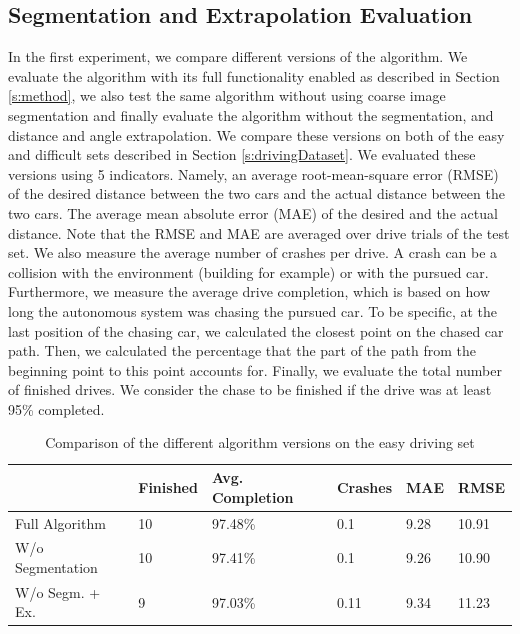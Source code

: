 \documentclass{ctuthesis/ctuthesis}
\begin{document}
\subsection{Segmentation and Extrapolation Evaluation} \label{s:experiment1}
In the first experiment, we compare different versions of the algorithm. We evaluate the algorithm with its full functionality enabled as described in Section \ref{s:method}, we also test the same algorithm without using coarse image segmentation and finally evaluate the algorithm without the segmentation, and distance and angle extrapolation. We compare these versions on both of the easy and difficult sets described in Section \ref{s:drivingDataset}. We evaluated these versions using 5 indicators. Namely, an average root-mean-square error (RMSE) of the desired distance between the two cars and the actual distance between the two cars. The average mean absolute error (MAE) of the desired and the actual distance. Note that the RMSE and MAE are averaged over drive trials of the test set. We also measure the average number of crashes per drive. A crash can be a collision with the environment (building for example) or with the pursued car. Furthermore, we measure the average drive completion, which is based on how long the autonomous system was chasing the pursued car. To be specific, at the last position of the chasing car, we calculated the closest point on the chased car path. Then, we calculated the percentage that the part of the path from the beginning point to this point accounts for. Finally, we evaluate the total number of finished drives. We consider the chase to be finished if the drive was at least 95\% completed.\par

\begin{table}[]
\tabcolsep=0.11cm
\begin{tabular}{l|lllll}
\hline
                                      & Finished & Avg. Completion  & Crashes & MAE  & RMSE   \\ \hline
Full Algorithm                         & 10       & 97.48\% & 0.1     & 9.28 & 10.91 \\
W/o Segmentation                    & 10       & 97.41\%          & 0.1     & 9.26 & 10.90 \\
W/o Segm. + Ex. & 9        & 97.03\%          & 0.11    & 9.34 & 11.23 \\ \hline
\end{tabular}
\caption{Comparison of the different algorithm versions on the easy driving set}\label{t:easy_drives}
\end{table}
\end{document}
